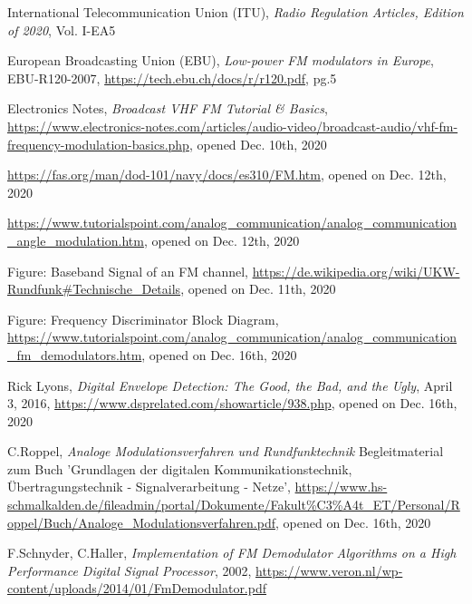 \documentclass[conference]{IEEEtran}
\begin{document}
%
%
%
\begin{thebibliography}{1}
    International Telecommunication Union (ITU), \emph{Radio Regulation Articles, Edition of 2020}, Vol. I-EA5

    European Broadcasting Union (EBU), \emph{Low-power FM modulators in Europe}, EBU-R120-2007, \url{https://tech.ebu.ch/docs/r/r120.pdf}, pg.5

    Electronics Notes, \emph{Broadcast VHF FM Tutorial \& Basics}, \url{https://www.electronics-notes.com/articles/audio-video/broadcast-audio/vhf-fm-frequency-modulation-basics.php}, opened Dec. 10th, 2020

    \url{https://fas.org/man/dod-101/navy/docs/es310/FM.htm}, opened on Dec. 12th, 2020

    \url{https://www.tutorialspoint.com/analog_communication/analog_communication_angle_modulation.htm}, opened on Dec. 12th, 2020

    Figure: Baseband Signal of an FM channel, \url{https://de.wikipedia.org/wiki/UKW-Rundfunk#Technische_Details}, opened on Dec. 11th, 2020

    Figure: Frequency Discriminator Block Diagram, \url{https://www.tutorialspoint.com/analog_communication/analog_communication_fm_demodulators.htm}, opened on Dec. 16th, 2020

    Rick Lyons, \emph{Digital Envelope Detection: The Good, the Bad, and the Ugly}, April 3, 2016, \url{https://www.dsprelated.com/showarticle/938.php}, opened on Dec. 16th, 2020

    C.Roppel, \emph{Analoge Modulationsverfahren und Rundfunktechnik} Begleitmaterial zum Buch 'Grundlagen der digitalen Kommunikationstechnik, Übertragungstechnik - Signalverarbeitung - Netze', \url{https://www.hs-schmalkalden.de/fileadmin/portal/Dokumente/Fakult%C3%A4t_ET/Personal/Roppel/Buch/Analoge_Modulationsverfahren.pdf}, opened on Dec. 16th, 2020

    F.Schnyder, C.Haller, \emph{Implementation of FM Demodulator
    Algorithms on a High Performance Digital Signal Processor}, 2002, \url{https://www.veron.nl/wp-content/uploads/2014/01/FmDemodulator.pdf}
\end{thebibliography}




\end{document}
